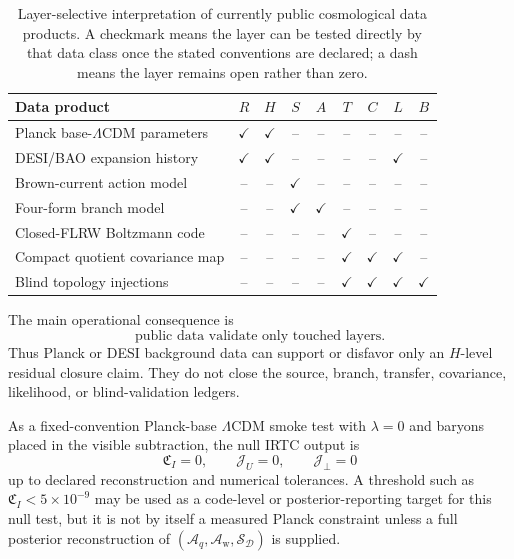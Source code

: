 \documentclass[
  aps,
  prd,
  reprint,
  superscriptaddress,
  floatfix,
  nofootinbib,
  longbibliography
]{revtex4-2}
\theoremstyle{plain}
\theoremstyle{definition}
\theoremstyle{remark}
\newcommand{\D}{\mathcal D}
\newcommand{\Aq}{\mathcal A_q}
\newcommand{\Aw}{\mathcal A_{\mathrm w}}
\newcommand{\LCDM}{\Lambda\mathrm{CDM}}
\newcommand{\Jcal}{\mathcal J}
\newcommand{\Scal}{\mathcal S}
\begin{document}
\begin{table}[t]
\caption{Layer-selective interpretation of currently public cosmological data products.  A checkmark means the layer can be tested directly by that data class once the stated conventions are declared; a dash means the layer remains open rather than zero.}
\label{tab:public_data_layers}
\begin{ruledtabular}
\begin{tabular}{lcccccccc}
Data product & \(R\) & \(H\) & \(S\) & \(A\) & \(T\) & \(C\) & \(L\) & \(B\)\\
\hline
Planck base-\(\LCDM\) parameters & \(\checkmark\) & \(\checkmark\) & -- & -- & -- & -- & -- & --\\
DESI/BAO expansion history & \(\checkmark\) & \(\checkmark\) & -- & -- & -- & -- & \(\checkmark\) & --\\
Brown-current action model & -- & -- & \(\checkmark\) & -- & -- & -- & -- & --\\
Four-form branch model & -- & -- & \(\checkmark\) & \(\checkmark\) & -- & -- & -- & --\\
Closed-FLRW Boltzmann code & -- & -- & -- & -- & \(\checkmark\) & -- & -- & --\\
Compact quotient covariance map & -- & -- & -- & -- & \(\checkmark\) & \(\checkmark\) & \(\checkmark\) & --\\
Blind topology injections & -- & -- & -- & -- & \(\checkmark\) & \(\checkmark\) & \(\checkmark\) & \(\checkmark\)\\
\hline\hline
\end{tabular}
\end{ruledtabular}
\end{table}

The main operational consequence is
\begin{equation}
\boxed{
\text{public data validate only touched layers.}
}
\end{equation}
Thus Planck or DESI background data can support or disfavor only an \(H\)-level residual closure claim.  They do not close the source, branch, transfer, covariance, likelihood, or blind-validation ledgers.

As a fixed-convention Planck-base $\LCDM$ smoke test with $\lambda=0$ and baryons placed in the visible subtraction, the null IRTC output is
\begin{equation}
\boxed{
\mathfrak C_I=0,
\qquad
\Jcal_U=0,
\qquad
\Jcal_\perp=0
}
\label{eq:planck_irct_null_smoke}
\end{equation}
up to declared reconstruction and numerical tolerances.  A threshold such as $\mathfrak C_I<5\times10^{-9}$ may be used as a code-level or posterior-reporting target for this null test, but it is not by itself a measured Planck constraint unless a full posterior reconstruction of $(\Aq,\Aw,\Scal_\D)$ is supplied.
\end{document}
